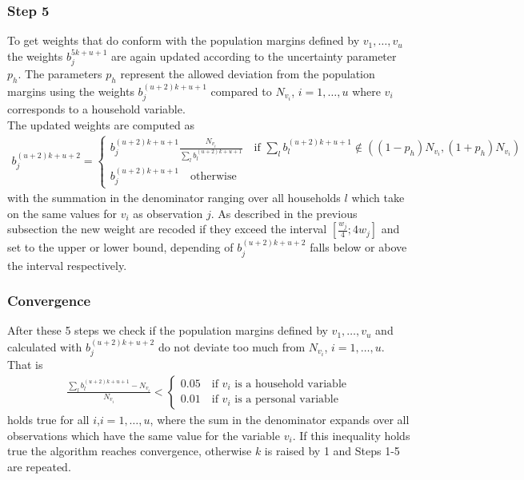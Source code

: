\documentclass{scrartcl}
\begin{document}
\subsubsection{Step 5}
To get weights that do conform with the population margins defined by $v_1,\ldots,v_u$ the weights $b_j^{5k+u+1}$ are again updated according to the uncertainty parameter $p_h$. The parameters $p_h$ represent the allowed deviation from the population margins using the weights $b_j^{(u+2)k+u+1}$ compared to $N_{v_i}$, $i=1,\ldots,u$ where $v_i$ corresponds to a household variable.\\
The updated weights are computed as
\begin{align*}
  b_j^{(u+2)k+u+2} =
  \begin{cases}
    b_j^{(u+2)k+u+1}\frac{N_{v_i}}{\sum\limits_{l}b_l^{(u+2)k+u+1}} \quad \text{if } \sum\limits_{l}b_l^{(u+2)k+u+1} \notin ((1-p_h)N_{v_i},(1+p_h)N_{v_i}) \\
    b_j^{(u+2)k+u+1} \quad \text{otherwise}
  \end{cases}
\end{align*}
with the summation in the denominator ranging over all households $l$ which take on the same values for $v_i$ as observation $j$. As described in the previous subsection the new weight are recoded if they exceed the interval $[\frac{w_j}{4};4w_j]$ and set to the upper or lower bound, depending of $b_j^{(u+2)k+u+2}$ falls below or above the interval respectively.

\subsubsection{Convergence}
After these 5 steps we check if the population margins defined by $v_1,\ldots,v_u$ and calculated with $b_j^{(u+2)k+u+2}$ do not deviate too much from $N_{v_i}$, $i=1,\ldots,u$. That is
\begin{align*}
  \frac{\sum\limits_{l}b_l^{(u+2)k+u+1} - N_{v_i}}{N_{v_i}} <
  \begin{cases}
  0.05 \quad\text{if }v_i\text{ is a household variable}\\
  0.01 \quad\text{if }v_i\text{ is a personal variable}
  \end{cases}
\end{align*}
holds true for all $i$,$i=1,\ldots,u$, where the sum in the denominator expands over all observations which have the same value for the variable $v_i$.
If this inequality holds true the algorithm reaches convergence, otherwise $k$ is raised by 1 and Steps 1-5 are repeated.
\end{document}
